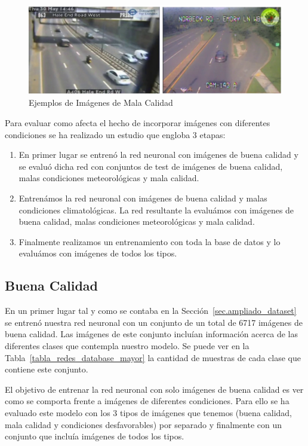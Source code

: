 \begin{figure}[H] 
\begin{center}
	\includegraphics[width=1\textwidth]{figures/Experimentos/mala_calidad.png}
   \caption{Ejemplos de Imágenes de Mala Calidad}
	\label{fig.mala_calidad}
\end{center}
\end{figure}


Para evaluar como afecta el hecho de incorporar imágenes con diferentes condiciones se ha realizado un estudio que engloba 3 etapas:

\begin{enumerate}
    \item En primer lugar se entrenó la red neuronal con imágenes de buena calidad y se evaluó dicha red con  conjuntos de test de imágenes de buena calidad, malas condiciones meteorológicas y mala calidad.
    \item Entrenámos la red neuronal con imágenes de buena calidad y malas condiciones climatológicas. La red resultante la evaluámos con imágenes de buena calidad, malas condiciones meteorológicas y mala calidad.
    \item Finalmente realizamos un entrenamiento con toda la base de datos y lo evaluámos con imágenes de todos los tipos.
\end{enumerate}

\subsection{Buena Calidad}

En un primer lugar tal y como se contaba en la Sección~\ref{sec.ampliado_dataset} se entrenó nuestra red neuronal con un conjunto de un total de 6717 imágenes de buena calidad. Las imágenes de este conjunto incluían información acerca de las diferentes clases que contempla nuestro modelo. Se puede ver en la Tabla~\ref{tabla_redes_database_mayor} la cantidad de muestras de cada clase que contiene este conjunto.

El objetivo de entrenar la red neuronal con solo imágenes de buena calidad es ver como se comporta frente a imágenes de diferentes condiciones. Para ello se ha evaluado este modelo con los 3 tipos de imágenes que tenemos (buena calidad, mala calidad y condiciones desfavorables) por separado y finalmente con un conjunto que incluía imágenes de todos los tipos.

